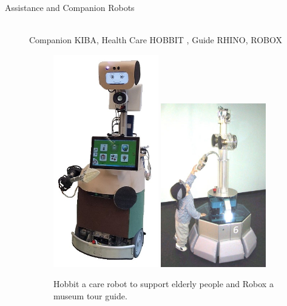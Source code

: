 \begin{description}
\item[Assistance and Companion Robots]\hfill \\
Companion KIBA, 
Health Care HOBBIT \cite{fischinger2013hobbit}, 
Guide RHINO, ROBOX \cite{philippsen:2004:phd}
\begin{figure}[thpb]
	  \myfloatalign
      \footnotesize
      \centering
    \subfloat
    {  \label{fig:fig_agv}
        \includegraphics[width=0.45\textwidth,height=0.4\textheight]{figures/fig_hobbit.png}
    }
    \subfloat
    {  \label{fig:fig_uav}
        \includegraphics[width=0.45\textwidth,height=0.4\textheight]{figures/fig_robox.png}
    }     
   \caption[Assitance robots]{Hobbit a care robot to support elderly people and Robox a museum tour guide.}
   \label{fig:fig_rescue}
\end{figure}



\end{description}
